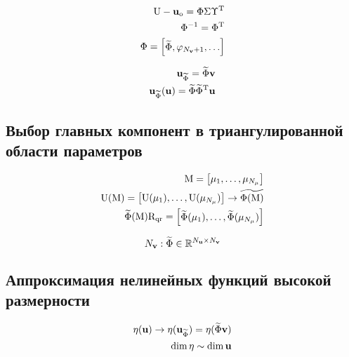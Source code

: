 \begin{align}
    \matr{u} - \unk_\text{o} = \Phi \Sigma \transpose{\Upsilon} \\
    \Phi^{-1} = \transpose{\Phi} \\
    \Phi = \begin{bmatrix}
        \widetilde{\Phi}, \pc[N_\vunk + 1], \dots
    \end{bmatrix}
\end{align}

\begin{align}
    \unk_{\widetilde{\Phi}} = \widetilde{\Phi} \vunk \\
    \unk_{\widetilde{\Phi}}(\unk) = \widetilde{\Phi} \transpose{\widetilde{\Phi}} \unk
\end{align}

\subsection{Выбор главных компонент в триангулированной области параметров}

\begin{align}
    \matr{M} =\begin{bmatrix}
        \param_1, \dots, \param_{N_\param}
    \end{bmatrix}\\
    \matr{U}(\matr{M}) =
    \begin{bmatrix}
        \matr{U}(\param_1), \dots, \matr{U}(\param_{N_\param})
    \end{bmatrix}
    \rightarrow \widetilde{\Phi (\matr{M})} \\
    \widetilde{\Phi} (\matr{M}) \matr{R}_\text{qr} =
    \begin{bmatrix}
        \widetilde{\Phi}(\param_1), \dots,  \widetilde{\Phi}(\param_{N_\param})
    \end{bmatrix}
\end{align}

\begin{equation}
N_{\mathbf{v}} : \widetilde{\Phi} \in \mathbb{R}^{N_{\mathbf{u}} \times N_{\mathbf{v}}}
\end{equation}

\subsection{Аппроксимация нелинейных функций высокой размерности}

\begin{align}
 \mathbf{\eta}(\mathbf{u}) \rightarrow \mathbf{\eta} (\mathbf{u}_{\widetilde{\Phi}}) = \mathbf{\eta} (\widetilde{\Phi} \mathbf{v}) \\
 \dim{\mathbf{\eta}} \sim \dim{\mathbf{u}}
\end{align}

